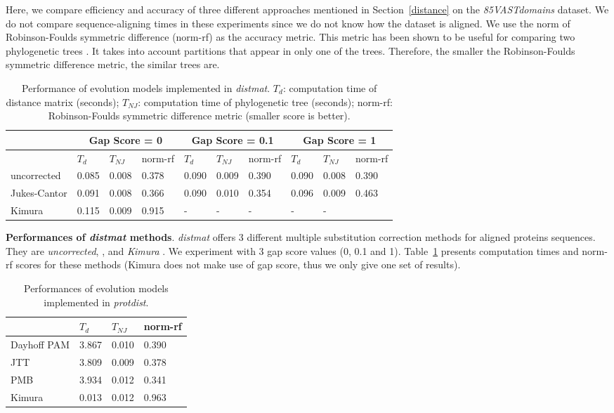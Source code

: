 \documentclass[11pt,letterpaper]{article}
\theoremstyle{definition}
\begin{document}
Here, we compare efficiency and accuracy of three different approaches mentioned in Section~\ref{distance} on the \textit{85VASTdomains} dataset. We do not compare sequence-aligning times in these experiments since we do not know how the dataset is aligned.
We use the norm of Robinson-Foulds symmetric difference (norm-rf) as the accuracy metric. This metric has been shown to be useful for comparing two phylogenetic trees \cite{robinson1981comparison}. It takes into account partitions that appear in only one of the trees. Therefore, the smaller the Robinson-Foulds symmetric difference metric, the similar trees are.

\begin{table}[h]
\centering
	\begin{tabular}{l|lll|lll|lll}
\multicolumn{1}{c}{} & \multicolumn{3}{c}{Gap Score = 0} & \multicolumn{3}{c}{Gap Score = 0.1} &  \multicolumn{3}{c}{Gap Score = 1} \\
\hline
&	$T_d$	& $T_{NJ}$	& norm-rf &	$T_d$	& $T_{NJ}$	& norm-rf &	$T_d$	& $T_{NJ}$	& norm-rf \\
\hline
uncorrected		&	0.085	&	0.008	&	0.378	&	0.090	&	0.009	&	0.390	&	0.090	&	0.008	&	0.390	\\
Jukes-Cantor	&	0.091	&	0.008	&	0.366	&	0.090	&	0.010	&	0.354	&	0.096	&	0.009	&	0.463	\\
Kimura 	&	0.115	&	0.009	&	0.915	&	-	&	-	&	-	&	-	&	-	&		\\
\hline
\end{tabular}
\caption{Performance of evolution models implemented in \textit{distmat}. $T_d$: computation time of distance matrix (seconds); $T_{NJ}$: computation time of phylogenetic tree (seconds); norm-rf: Robinson-Foulds symmetric difference metric (smaller score is better).
}\label{tab:dist1}
\end{table}

\textbf{Performances of \textit{distmat} methods}. \textit{distmat} offers 3 different multiple substitution correction methods for aligned proteins sequences. They are \textit{uncorrected},  \cite{jukes1969evolution}, and \textit{Kimura} \cite{kimura1980simple}. We experiment with 3 gap score values (0, 0.1 and 1). Table~\ref{tab:dist1} presents computation times and norm-rf scores for these methods (Kimura does not make use of gap score, thus we only give one set of results).

\begin{table}[h]
\centering
	\begin{tabular}{l|lll}
	\hline
	&	$T_d$	& $T_{NJ}$	& norm-rf  \\
	\hline
	Dayhoff PAM	&	3.867	&	0.010	&	0.390	\\
	JTT			&	3.809	&	0.009	&	0.378	\\
	PMB			&	3.934	&	0.012	&	0.341	\\
	Kimura		&	0.013	&	0.012	&	0.963	\\
	\hline
	\end{tabular}
\caption{Performances of evolution models implemented in \textit{protdist}.}\label{tab:dist2}
\end{table}
\end{document}
